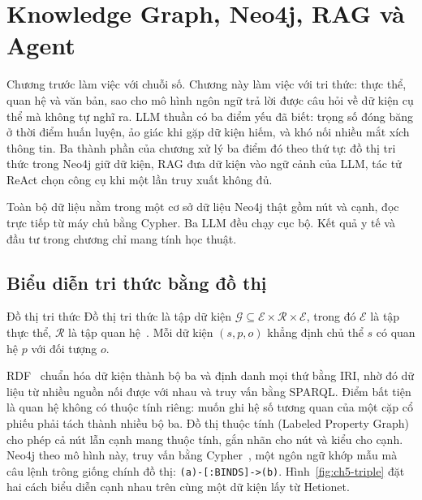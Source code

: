 \newcommand{\maCypher}[2]{%
  \begin{listing}[!htbp]\caption{#2}\label{code:cy-#1}\inputminted[ignorelexererrors=true]{cypher}{generated/ch5_cy_#1.cypher}\end{listing}}
\chapter{Knowledge Graph, Neo4j, RAG và Agent}\label{ch:kg}

Chương trước làm việc với chuỗi số. Chương này làm việc với tri thức: thực thể, quan hệ và văn bản, sao cho mô hình ngôn ngữ trả lời được câu hỏi về dữ kiện cụ thể mà không tự nghĩ ra. LLM thuần có ba điểm yếu đã biết: trọng số đóng băng ở thời điểm huấn luyện, ảo giác khi gặp dữ kiện hiếm, và khó nối nhiều mắt xích thông tin. Ba thành phần của chương xử lý ba điểm đó theo thứ tự: đồ thị tri thức trong Neo4j giữ dữ kiện, RAG đưa dữ kiện vào ngữ cảnh của LLM, tác tử ReAct chọn công cụ khi một lần truy xuất không đủ.

Toàn bộ dữ liệu nằm trong một cơ sở dữ liệu Neo4j thật gồm  nút và  cạnh, đọc trực tiếp từ máy chủ bằng Cypher. Ba LLM đều chạy cục bộ. Kết quả y tế và đầu tư trong chương chỉ mang tính học thuật.

\section{Biểu diễn tri thức bằng đồ thị}

\begin{dinhnghia}{Đồ thị tri thức}
Đồ thị tri thức là tập dữ kiện $\mathcal{G} \subseteq \mathcal{E} \times \mathcal{R} \times \mathcal{E}$, trong đó $\mathcal{E}$ là tập thực thể, $\mathcal{R}$ là tập quan hệ~\cite{ch5hogan}. Mỗi dữ kiện $(s, p, o)$ khẳng định chủ thể $s$ có quan hệ $p$ với đối tượng $o$.
\end{dinhnghia}

RDF~\cite{ch5rdf} chuẩn hóa dữ kiện thành bộ ba và định danh mọi thứ bằng IRI, nhờ đó dữ liệu từ nhiều nguồn nối được với nhau và truy vấn bằng SPARQL. Điểm bất tiện là quan hệ không có thuộc tính riêng: muốn ghi hệ số tương quan của một cặp cổ phiếu phải tách thành nhiều bộ ba. Đồ thị thuộc tính (Labeled Property Graph) cho phép cả nút lẫn cạnh mang thuộc tính, gắn nhãn cho nút và kiểu cho cạnh. Neo4j theo mô hình này, truy vấn bằng Cypher~\cite{ch5cypher}, một ngôn ngữ khớp mẫu mà câu lệnh trông giống chính đồ thị: \texttt{(a)-[:BINDS]->(b)}. Hình~\ref{fig:ch5-triple} đặt hai cách biểu diễn cạnh nhau trên cùng một dữ kiện lấy từ Hetionet.


